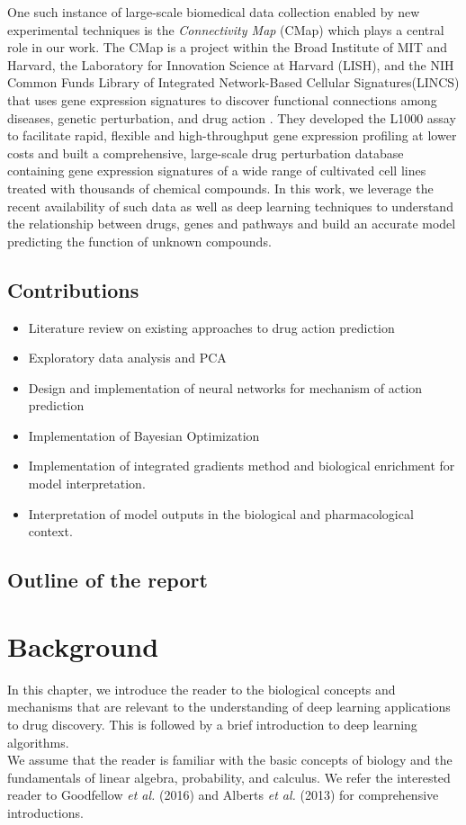 \documentclass[bsc,frontabs,twoside,singlespacing,parskip,deptreport]{infthesis}     %
\let\Oldsection\section
\renewcommand{\section}{\FloatBarrier\Oldsection}
\begin{document}
One such instance of large-scale biomedical data collection enabled by new experimental techniques is the \textit{Connectivity Map} (CMap) \cite{lamb_connectivity_2006} which plays a central role in our work. The CMap is a project within the Broad Institute of MIT and Harvard, the Laboratory for Innovation Science at Harvard (LISH), and the  NIH  Common  Funds  Library  of  Integrated  Network-Based  Cellular  Signatures(LINCS) that uses gene expression signatures to discover functional connections among diseases, genetic perturbation, and drug action \cite{musa_review_2017}. They developed the L1000 assay to facilitate rapid, flexible and high-throughput gene expression profiling at lower costs \cite{subramanian_next_2017} and built a comprehensive, large-scale drug perturbation database containing gene expression signatures of a wide range of cultivated cell lines treated with thousands of chemical compounds. In this work, we leverage the recent availability of such data as well as deep learning techniques to understand the relationship between drugs, genes and pathways and build an accurate model predicting the function of unknown compounds.


\section{Contributions}
\begin{itemize}
\item Literature review on existing approaches to drug action prediction 
\item Exploratory data analysis and PCA
\item Design and implementation of neural networks for mechanism of action prediction
\item Implementation of Bayesian Optimization
\item Implementation of integrated gradients method and biological enrichment for model interpretation.
\item Interpretation of model outputs in the biological and pharmacological context.
\end{itemize}
\section{Outline of the report}

\chapter{Background}
In this chapter, we introduce the reader to the biological concepts and mechanisms that are relevant to the understanding of deep learning applications to drug discovery. This is followed by a brief introduction to deep learning algorithms. \\
We assume that the reader is familiar with the basic concepts of biology and the fundamentals of linear algebra, probability, and calculus. We refer the interested reader to Goodfellow \textit{et al.} (2016) \cite{goodfellow_deep_2016} and Alberts \textit{et al.} (2013) \cite{alberts_essential_2013} for comprehensive introductions.
\end{document}
